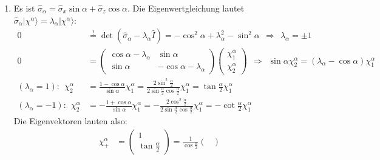 \documentclass[a4paper,12pt]{article}
\newcommand{\braket}{}
\newcommand{\Ket}{}
\begin{document}
\begin{enumerate}
\begin{align*}
\begin{pmatrix}
1 & 0 \\ 0 & -1
\end{pmatrix}\\
\hat{\sigma}_x&=\begin{pmatrix}
\braket\langle {+_z} | {\hat{\sigma}_x} | {+_z}\rangle & \braket\langle {+_z} | {\hat{\sigma}_x} | {-_z}\rangle \\ \braket\langle {-_z} | {\hat{\sigma}_x} | {+_z}\rangle & \braket\langle {-_z} | {\hat{\sigma}_x} | {-_z}\rangle 
\end{pmatrix}=\begin{pmatrix}
0 & 1 \\ 1 & 0
\end{pmatrix}
\end{align*}
\item[b)] Es ist $\hat{\sigma}_\alpha=\hat{\sigma}_x\sin\alpha +\hat{\sigma}_z\cos\alpha$. Die Eigenwertgleichung lautet $\hat{\sigma}_\alpha\Ket | {\chi^\alpha} \rangle=\lambda_\alpha\Ket | {\chi^\alpha} \rangle$:
\begin{align*}
0&\overset{!}{=}\det(\hat{\sigma}_\alpha -\lambda_\alpha\hat{I})=-\cos^2\alpha+\lambda_\alpha^2-\sin^2\alpha\ \ \Rightarrow\ \ \lambda_\alpha=\pm 1\\
0&=\begin{pmatrix}
\cos\alpha -\lambda_\alpha & \sin\alpha \\ \sin\alpha & -\cos\alpha -\lambda_\alpha
\end{pmatrix}\begin{pmatrix}
\chi_1^\alpha \\ \chi_2^\alpha
\end{pmatrix}\ \ \Rightarrow\ \ \sin\alpha\chi_2^\alpha = (\lambda_\alpha -\cos\alpha)\chi_1^\alpha\\
(\lambda_\alpha=1):\ \ \chi_2^\alpha&=\frac{1-\cos\alpha}{\sin\alpha}\chi_1^\alpha=\frac{2\sin^2\frac{\alpha}{2}}{2\sin\frac{\alpha}{2}\cos\frac{\alpha}{2}}\chi_1^\alpha=\tan\frac{\alpha}{2}\chi_1^\alpha\\
(\lambda_\alpha=-1):\ \ \chi_2^\alpha&=-\frac{1+\cos\alpha}{\sin\alpha}\chi_1^\alpha=-\frac{2\cos^2\frac{\alpha}{2}}{2\sin\frac{\alpha}{2}\cos\frac{\alpha}{2}}\chi_1^\alpha=-\cot\frac{\alpha}{2}\chi_1^\alpha
\end{align*}
Die Eigenvektoren lauten also:
\begin{align*}
\chi_+^\alpha&=\begin{pmatrix}
1 \\ \tan\frac{\alpha}{2}
\end{pmatrix}=\frac{1}{\cos\frac{\alpha}{2}}\begin{pmatrix}

\end{pmatrix}
\end{align*}
\end{enumerate}
\end{document}
